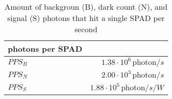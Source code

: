 \begin{table}[H]
\centering
\caption{Amount of backgroun (B), dark count (N), and signal (S) photons that hit a single SPAD per second}
\label{tab:photons_per_SPAD}
\begin{tabular}{|l|r|}\hline
    \textbf{photons per SPAD} & \\
    \hline 
    $PPS_B$ & $1.38\cdot10^{6}\, \text{photon}/s$ \\
    $PPS_N$ & $2.00\cdot10^{3}\, \text{photon}/s$ \\
    $PPS_S$ & $1.88\cdot10^{5}\, \text{photon}/s/W$ \\
    \hline 
\end{tabular}
\end{table}
